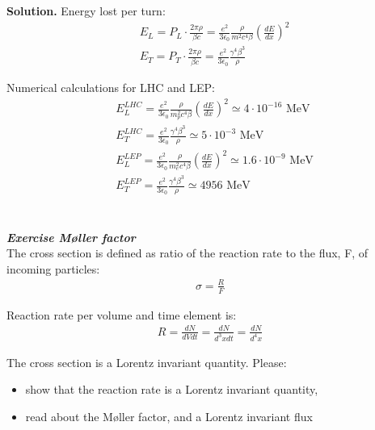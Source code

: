 \documentclass[11pt,a4paper]{article}
\newcounter{zadanie}\newcommand{\zadanie}[1][]{\addtocounter{zadanie}{1} ~\\  {\bf \emph{Exercise \arabic{zadanie} #1 }} \\}
\newenvironment{solution}{\vspace{1cm} \par\textbf{Solution.} \vspace{1cm}}{\newpage}
\begin{document}
\begin{solution}
Energy lost per turn:
\begin{align*}
  & E_{L} = P_{L} \cdot \frac{2\pi \rho}{\beta c} = \frac{e^{2}}{3\epsilon_0} \frac{\rho}{m^{2}c^{4} \beta}  \left( \frac{dE}{dx} \right)^{2} \\
  & E_{T} = P_{T} \cdot \frac{2\pi \rho}{\beta c} = \frac{e^{2}}{3\epsilon_0} \frac{\gamma^{4} \beta^{3}}{\rho}
\end{align*}


Numerical calculations for LHC and LEP:
\begin{align*}
  & E_{L}^{LHC} = \frac{e^{2}}{3\epsilon_0} \frac{\rho}{m_{p}^{2}c^{4} \beta}  \left( \frac{dE}{dx} \right)^{2} \simeq 4\cdot 10^{-16} \text{ MeV} \\
  & E_{T}^{LHC} = \frac{e^{2}}{3\epsilon_0} \frac{\gamma^{4} \beta^{3}}{\rho} \simeq 5 \cdot 10^{-3} \text{ MeV} \\
  & E_{L}^{LEP} = \frac{e^{2}}{3\epsilon_0} \frac{\rho}{m_{e}^{2}c^{4} \beta}  \left( \frac{dE}{dx} \right)^{2} \simeq 1.6 \cdot 10^{-9} \text{ MeV} \\
  & E_{T}^{LEP} = \frac{e^{2}}{3\epsilon_0} \frac{\gamma^{4} \beta^{3}}{\rho} \simeq 4956 \text{ MeV} \\
\end{align*}

\end{solution}
\zadanie[M\o ller factor]

The cross section is defined as ratio of the reaction 
rate to the flux, F, of incoming particles:
\begin{align*}
  \sigma = \frac{R}{F}
\end{align*}

Reaction rate per volume and time element is:
\begin{align*}
  R = \frac{dN}{dV dt} = \frac{dN}{d^{3}x dt} = \frac{dN}{d^{4}x}
\end{align*}

The cross section is a Lorentz invariant quantity. Please:
\begin{itemize}
  \item show that the reaction rate is a Lorentz invariant quantity,
  \item read about the M\o ller factor, and a Lorentz invariant flux
\end{itemize}
\end{document}

